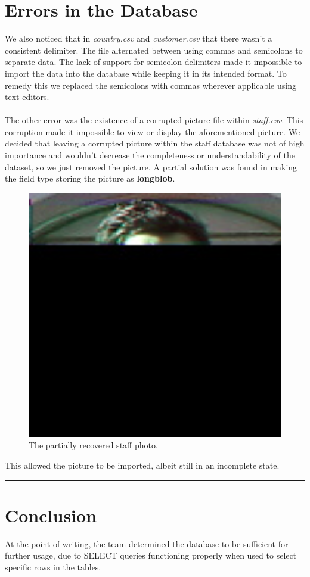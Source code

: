 \documentclass{article}
\begin{document}
\section{Errors in the Database}
	We also noticed that in \emph{country.csv} and \emph{customer.csv} that there wasn’t a consistent delimiter. The file alternated between using commas 
	and semicolons to separate data. The lack of support for semicolon delimiters made it impossible to import the data into the database while keeping it in its intended format. 
	To remedy this we replaced the semicolons with commas wherever applicable using text editors.
	\\\\
	The other error was the existence of a corrupted picture file within \emph{staff.csv}. This corruption made it impossible to view or display the aforementioned picture. 
	We decided that leaving a corrupted picture within the staff database was not of high importance and wouldn’t decrease the completeness or understandability of the dataset,
	so we just removed the picture. A partial solution was found in making the field type storing the picture as \textbf{longblob}. 
	\begin{figure}[H]
		\includegraphics[width=13cm]{staff-picture}
		\caption{The partially recovered staff photo.}
	\end{figure}
	This allowed the picture to be imported, albeit still in an incomplete state. 
	\\
	\rule{\textwidth}{0.4pt}

\section{Conclusion}
	At the point of writing, the team determined the database to be sufficient for further usage, due to SELECT queries functioning properly when used to select specific rows in the tables.
\end{document}
